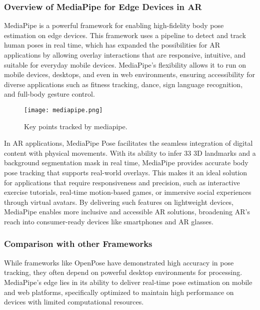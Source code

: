 \subsubsection{Overview of MediaPipe for Edge Devices in AR}

MediaPipe\cite{lugaresi2019mediapipe} is a powerful framework for enabling high-fidelity body pose estimation on edge devices.
This framework uses a pipeline to detect and track human poses in real time, which has expanded the possibilities for AR applications by allowing overlay interactions that are responsive, intuitive, and suitable for everyday mobile devices.
MediaPipe's flexibility allows it to run on mobile devices, desktops, and even in web environments, ensuring accessibility for diverse applications such as fitness tracking, dance, sign language recognition, and full-body gesture control.

\begin{figure}[h]
    \centering
    \texttt{[image: mediapipe.png]}
    \caption{Key points tracked by mediapipe.}
    \vspace{0.1cm}
    \label{fig:mediapipe}
\end{figure}

In AR applications, MediaPipe Pose facilitates the seamless integration of digital content with physical movements.
With its ability to infer 33 3D landmarks and a background segmentation mask in real time, MediaPipe provides accurate body pose tracking that supports real-world overlays.
This makes it an ideal solution for applications that require responsiveness and precision, such as interactive exercise tutorials, real-time motion-based games, or immersive social experiences through virtual avatars.
By delivering such features on lightweight devices, MediaPipe enables more inclusive and accessible AR solutions, broadening AR’s reach into consumer-ready devices like smartphones and AR glasses.

\subsubsection{ Comparison with other Frameworks}

While frameworks like OpenPose\cite{cao2017realtime} have demonstrated high accuracy in pose tracking, they often depend on powerful desktop environments for processing.
MediaPipe’s edge lies in its ability to deliver real-time pose estimation on mobile and web platforms, specifically optimized to maintain high performance on devices with limited computational resources.

